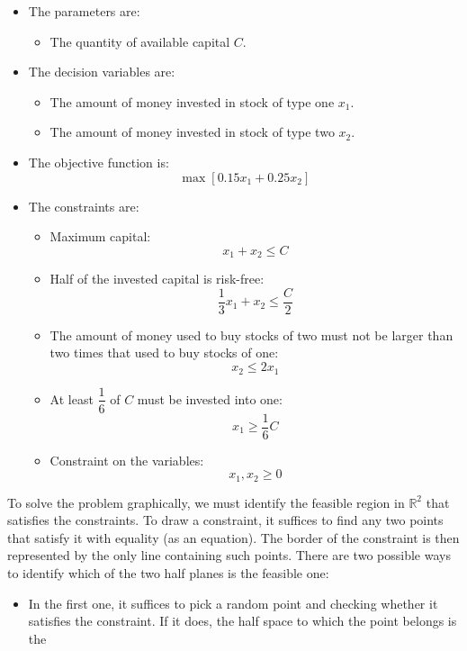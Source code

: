 \documentclass[12pt, a4paper]{report}
\newtheorem[style=M,bodystyle=\normalfont]{theorem}{Theorem}
\newtheorem[style=M,bodystyle=\normalfont]{corollary}{Corollary}
\newtheorem[style=M,bodystyle=\normalfont]{lemma}{Lemma}
\newtheorem[style=M,bodystyle=\normalfont]{definition}{Definition}
\begin{document}
\begin{Answer}[ref=1]
    \begin{itemize}
        \item The parameters are: 
            \begin{itemize}
                \item The quantity of available capital $C$. 
            \end{itemize}
        \item The decision variables are:
            \begin{itemize}
                \item The amount of money invested in stock of type one $x_1$. 
                \item The amount of money invested in stock of type two $x_2$. 
            \end{itemize}
        \item The objective function is: 
            \[\max{\left[0.15x_1+0.25x_2\right]}\]
        \item The constraints are:
            \begin{itemize}
                \item Maximum capital: 
                    \[x_1+x_2 \leq C\]
                \item Half of the invested capital is risk-free:
                    \[\dfrac{1}{3}x_1+x_2 \leq \dfrac{C}{2}\]
                \item The amount of money used to buy stocks of two must not be larger than two times that used to buy stocks of one:
                    \[x_2 \leq 2x_1\]
                \item At least $\dfrac{1}{6}$ of $C$ must be invested into one: 
                    \[x_1 \geq \dfrac{1}{6}C\]
                \item Constraint on the variables:
                    \[x_1,x_2 \geq 0\]
            \end{itemize}
    \end{itemize}
    To solve the problem graphically, we must identify the feasible region in $\mathbb{R}^2$ that satisfies the constraints. To draw a constraint, it suffices to find any two points 
    that satisfy it with equality (as an equation). The border of the constraint is then represented by the only line containing such points. There are two possible ways to identify 
    which of the two half planes is the feasible one:
    \begin{itemize}
        \item In the first one, it suffices to pick a random point and checking whether it satisfies the constraint. If it does, the half space to which the point belongs is the

\end{itemize}
\end{Answer}
\end{document}
